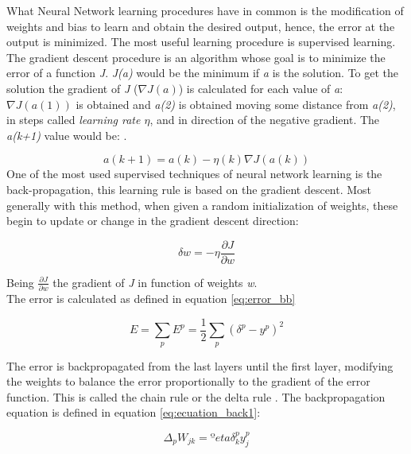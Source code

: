 What Neural Network learning procedures have in common is the modification of weights and bias to learn and obtain the desired output, hence, the error at the output is minimized. The most useful learning procedure is supervised learning.\\

The gradient descent procedure is an algorithm whose goal is to minimize the error of a function \textit{J}. \textit{J(a)} would be the minimum if \textit{a} is the solution. To get the solution the gradient of \textit{J} ($\nabla J(a)$) is calculated for each value of \textit{a}: $\nabla J(a(1))$ is obtained and \textit{a(2)} is obtained moving some distance from \textit{a(2)}, in steps called \textit{learning rate $\eta$}, and in direction of the negative gradient. The \textit{a(k+1)} value would be: \cite{Duda}.

\begin{equation}
a(k+1) = a(k) - \eta (k) \nabla J(a(k))
\end{equation}
One of the most used supervised techniques of neural network learning is the back-propagation, this learning rule is based on the gradient descent. Most generally with this method, when given a random initialization of weights, these begin to update or change in the gradient descent direction:

\begin{equation}
\delta w = -\eta\frac{\partial J}{\partial w}
\end{equation}

Being $\frac{\partial J}{\partial w}$ the gradient of \textit{J} in function of weights \textit{w}.\\

The error is calculated as defined in equation \ref{eq:error_bb}

\begin{equation}
E=\sum_{p}E^p = \frac{1}{2}\sum_{p}(\delta^p- y^p)^2
\end{equation} \label{eq:error_bb}

The error is backpropagated from the last layers until the first layer, modifying the weights to balance the error proportionally to the gradient of the error function. This is called the chain rule or the delta rule \cite{Duda, BINN, krose}. The backpropagation equation is defined in equation \ref{eq:ecuation_back1}:

			\begin{equation}
			\Delta_{p}W_{jk}=ºeta \delta _{k}^{p}y_{j}^{p}
			\label{eq:ecuation_back1}
			\end{equation}\\

